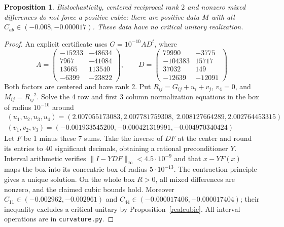 \documentclass[11pt,a4paper]{article}
\newtheorem{prop}[thm]{Proposition}
\begin{document}
\begin{prop}\label{rankonlyobstruction}
Bistochasticity, centered reciprocal rank $2$ and nonzero mixed
differences do not force a positive cubic: there are positive data $M$
with all $C_{ab}\in(-0.008,-0.000017)$. These data have no critical
unitary realization.
\end{prop}
\begin{proof}
An explicit certificate uses $G=10^{-10}AD^t$, where
\[
 A=\begin{pmatrix}-15233&-48634\\7967&-41084\\13665&113540\\-6399&-23822\end{pmatrix},
 \qquad
 D=\begin{pmatrix}79990&-3775\\-104383&15717\\37032&149\\-12639&-12091\end{pmatrix}
\]
Both factors are centered and have rank 2. Put
$R_{ij}=G_{ij}+u_i+v_j$, $v_4=0$, and $M_{ij}=R_{ij}^{-2}$.
Solve the 4 row and first 3 column normalization equations in
the box of radius $10^{-10}$ around
\[
 \begin{gathered}
 (u_1,u_2,u_3,u_4)=(2.007055173083,2.007781759308,\ 
                  2.008127664289,2.002764453315)\\
 (v_1,v_2,v_3)=(-0.001933545200,-0.000421319991,-0.004970340424)
 \end{gathered}
\]
Let $F$ be 1 minus these 7 sums. Take the inverse of $DF$ at the center and round its entries to 40
significant decimals, obtaining a rational preconditioner $Y$. Interval arithmetic verifies
$\|I-YDF\|_\infty<4.5\cdot10^{-9}$ and that $x-YF(x)$ maps the box
into its concentric box of radius $5\cdot10^{-13}$. The contraction
principle gives a unique solution. On the whole box $R>0$, all mixed
differences are nonzero, and the claimed cubic bounds hold.
Moreover $C_{11}\in(-0.002962,-0.002961)$ and
$C_{44}\in(-0.000017406,-0.000017404)$; their inequality excludes a
critical unitary by Proposition~\ref{realcubic}.
All interval operations are in \texttt{curvature.py}.
\end{proof}
\end{document}
